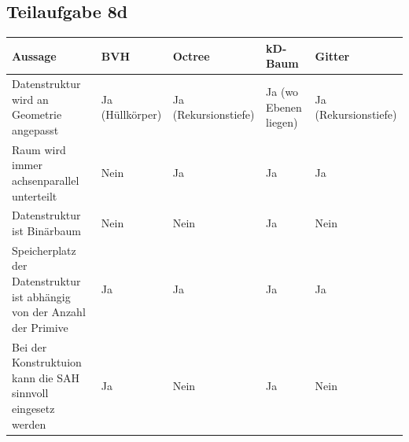 \documentclass[a4paper]{scrartcl}
\begin{document}
\subsection*{Teilaufgabe 8d}
\begin{tabular}{p{4cm}p{2.2cm}p{2.2cm}p{2.2cm}p{2.2cm}}\toprule
Aussage                                                                 & BVH             & Octree               & kD-Baum               & Gitter               \\\midrule
Datenstruktur wird an Geometrie angepasst                               & Ja (Hüllkörper) & Ja (Rekursionstiefe) & Ja (wo Ebenen liegen) & Ja (Rekursionstiefe) \\
Raum wird immer achsen\-parallel unterteilt                             & Nein            & Ja                   & Ja                    & Ja                   \\
Datenstruktur ist Binär\-baum\footnotemark                              & Nein            & Nein                 & Ja                    & Nein                 \\
Speicherplatz der Daten\-struktur ist abhängig von der Anzahl der Primive & Ja            & Ja                   & Ja                    & Ja                   \\
Bei der Konstruktuion kann die SAH sinnvoll eingesetz werden            & Ja\footnotemark & Nein                 & Ja                    & Nein                 \\\bottomrule
\end{tabular}
\end{document}
